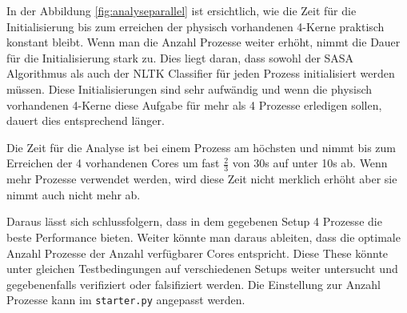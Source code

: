 In der Abbildung \ref{fig:analyseparallel} ist ersichtlich, wie die Zeit für die Initialisierung bis zum erreichen der physisch vorhandenen 4-Kerne praktisch konstant bleibt. Wenn man die Anzahl Prozesse weiter erhöht, nimmt die Dauer für die Initialisierung stark zu. Dies liegt daran, dass sowohl der SASA Algorithmus als auch der NLTK Classifier für jeden Prozess initialisiert werden müssen. Diese Initialisierungen sind sehr aufwändig und wenn die physisch vorhandenen 4-Kerne diese Aufgabe für mehr als 4 Prozesse erledigen sollen, dauert dies entsprechend länger.

Die Zeit für die Analyse ist bei einem Prozess am höchsten und nimmt bis zum Erreichen der 4 vorhandenen Cores um fast $\frac{2}{3}$ von 30s auf unter 10s ab. Wenn mehr Prozesse verwendet werden, wird diese Zeit nicht merklich erhöht aber sie nimmt auch nicht mehr ab.

Daraus lässt sich schlussfolgern, dass in dem gegebenen Setup 4 Prozesse die beste Performance bieten. Weiter könnte man daraus ableiten, dass die optimale Anzahl Prozesse der Anzahl verfügbarer Cores entspricht. Diese These könnte unter gleichen Testbedingungen auf verschiedenen Setups weiter untersucht und gegebenenfalls verifiziert oder falsifiziert werden. Die Einstellung zur Anzahl Prozesse kann im \lstinline$starter.py$ angepasst werden.